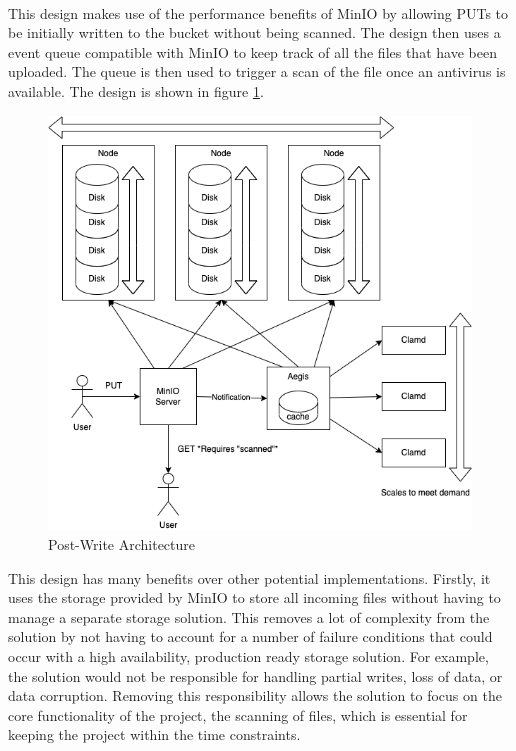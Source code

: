 \documentclass[12pt, conference, final, a4paper, onecolumn, compsoc]{IEEEtran}
\begin{document}
    \paragraph{}
    This design makes use of the performance benefits of MinIO by allowing PUTs
    to be initially written to the bucket without being scanned. The design
    then uses a event queue compatible with MinIO to keep track of all the files
    that have been uploaded. The queue is then used to trigger a scan of the
    file once an antivirus is available. The design is shown in figure
    \ref{fig:postWriteArch}.

    \begin{figure}
        \includegraphics[scale=.4]{diagrams/post-write.png}
        \caption{Post-Write Architecture}
        \label{fig:postWriteArch}
    \end{figure}

    This design has many benefits over other potential implementations. Firstly,
    it uses the storage provided by MinIO to store all incoming files without
    having to manage a separate storage solution. This removes a lot of
    complexity from the solution by not having to account for a number of
    failure conditions that could occur with a high availability, production
    ready storage solution. For example, the solution would not be responsible for
    handling partial writes, loss of data, or data corruption. Removing this
    responsibility allows the solution to focus on the core functionality of the
    project, the scanning of files, which is essential for keeping the project
    within the time constraints.
\end{document}
